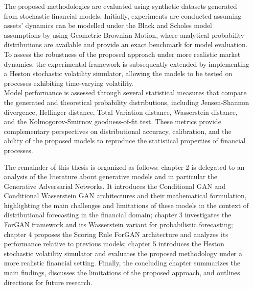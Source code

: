 The proposed methodologies are evaluated using synthetic datasets generated from stochastic financial models. 
Initially, experiments are conducted assuming assets' dynamics can be modelled under the Black and Scholes model assumptions by using Geometric Brownian Motion, 
where analytical probability distributions are available and provide an exact benchmark for model evaluation.
To assess the robustness of the proposed approach under more realistic market dynamics, the experimental framework is subsequently extended by implementing a Heston stochastic volatility simulator, 
allowing the models to be tested on processes exhibiting time-varying volatility.\\

Model performance is assessed through several statistical measures that compare the generated and theoretical probability distributions, including Jensen-Shannon divergence, Hellinger distance, Total Variation distance, Wasserstein distance, and the Kolmogorov-Smirnov goodness-of-fit test.
These metrics provide complementary perspectives on distributional accuracy, calibration, and the ability of the proposed models to reproduce the statistical properties of financial processes.

The remainder of this thesis is organized as follows: chapter 2 is delegated to an analysis of the literature about generative models and in particular the Generative Adversarial Networks. It introduces the Conditional GAN and
Conditional Wasserstein GAN architectures and their mathematical formulation, highlighting the main challenges and limitations of these models in the context of distributional forecasting in the financial domain; 
chapter 3 investigates the ForGAN framework and its Wasserstein variant for probabilistic forecasting; 
chapter 4 proposes the Scoring Rule ForGAN architecture and analyzes its performance relative to previous models;
chapter 5 introduces the Heston stochastic volatility simulator and evaluates the proposed methodology under a more realistic financial setting. 
Finally, the concluding chapter summarizes the main findings, discusses the limitations of the proposed approach, and outlines directions for future research.
